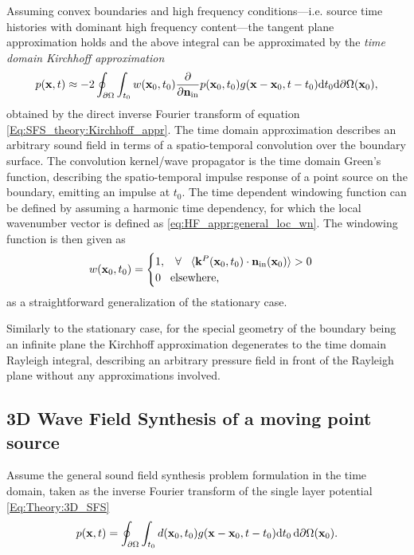 Assuming convex boundaries and high frequency conditions---i.e. source time histories with dominant high frequency content---the tangent plane approximation holds and the above integral can be approximated by the \emph{time domain Kirchhoff approximation}
\begin{equation}
\label{eq:theory:KA_td}
p(\mathbf{x},t) \approx -2 \oint_{\partial \Omega} \int_{t_0} w(\mathbf{x}_0,t_0) \frac{\partial}{\partial \mathbf{n}_{\mathrm{in}}}  p(\mathbf{x}_0,t_0) g(\mathbf{x} - \mathbf{x}_0, t - t_0) \mathrm{d} t_0 \mathrm{d} \partial \Omega(\mathbf{x}_0),
\end{equation}
obtained by the direct inverse Fourier transform of equation \eqref{Eq:SFS_theory:Kirchhoff_appr}.
The time domain approximation describes an arbitrary sound field in terms of a spatio-temporal convolution over the boundary surface.
The convolution kernel/wave propagator is the time domain Green's function, describing the spatio-temporal impulse response of a point source on the boundary, emitting an impulse at $t_0$.
The time dependent windowing function can be defined by assuming a harmonic time dependency, for which the local wavenumber vector is defined as \eqref{eq:HF_appr:general_loc_wn}.
The windowing function is then given as
\begin{equation}
w(\mathbf{x}_0,t_0) = \begin{cases}
                        1, \hspace{3mm} \forall \hspace{3mm} \langle \mathbf{k}^P(\mathbf{x}_0,t_0) \cdot \mathbf{n}_{\mathrm{in}}(\mathbf{x}_0) \rangle > 0 \\
                        0  \hspace{3mm} \text{elsewhere},
                    \end{cases}
\label{eq:theory:windowing_function}
\end{equation}
as a straightforward generalization of the stationary case.

Similarly to the stationary case, for the special geometry of the boundary being an infinite plane the Kirchhoff approximation degenerates to the time domain Rayleigh integral, describing an arbitrary pressure field in front of the Rayleigh plane without any approximations involved.

\subsection{3D Wave Field Synthesis of a moving point source}

Assume the general sound field synthesis problem formulation in the time domain, taken as the inverse Fourier transform of the single layer potential \eqref{Eq:Theory:3D_SFS}
\begin{equation}
p(\mathbf{x},t) = \oint_{\partial \Omega} \int_{t_0} d(\mathbf{x}_0,t_0) g(\mathbf{x} - \mathbf{x}_0 , t-t_0 ) \mathrm{d} t_0 \, \mathrm{d} \partial \Omega ( \mathbf{x}_0 ).
\label{eq:moving_source:SFS_problem_td}
\end{equation}

